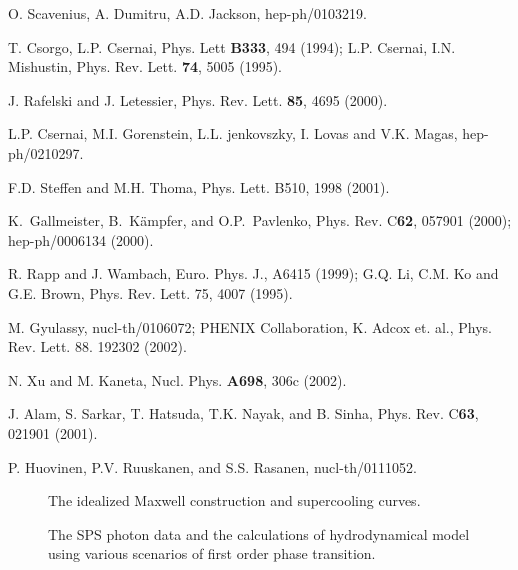 \begin{thebibliography}{00}
 O. Scavenius, A. Dumitru, A.D. Jackson, 
          hep-ph/0103219.
          
 T. Csorgo, L.P. Csernai, Phys. Lett {\bf B333}, 494 (1994);
       L.P. Csernai, I.N. Mishustin, Phys. Rev. Lett. {\bf 74}, 5005 (1995).
       
 J. Rafelski and J. Letessier, Phys. Rev. Lett. {\bf 85},
                  4695 (2000).

 L.P. Csernai, M.I. Gorenstein, L.L. jenkovszky, 
                        I. Lovas and V.K. Magas, hep-ph/0210297.

 F.D. Steffen and M.H. Thoma, Phys. Lett. B510, 
                  1998 (2001).
                  
 K.\ Gallmeister, B.\ K\"ampfer, and O.P.\ Pavlenko, 
            Phys. Rev. C{\bf 62}, 057901 (2000); hep-ph/0006134 (2000).

 R. Rapp and J. Wambach, Euro. Phys. J., A6415 (1999);
           G.Q. Li, C.M. Ko and G.E. Brown, Phys. Rev. Lett. 75,
           4007 (1995).

 M. Gyulassy, nucl-th/0106072; PHENIX Collaboration, 
           K. Adcox et. al., Phys. Rev. Lett. 88. 192302 (2002).

 N. Xu and M. Kaneta, Nucl. Phys. {\bf A698}, 306c (2002).

 J. Alam, S. Sarkar, T. Hatsuda, T.K. Nayak, and B. Sinha,
              Phys. Rev. C{\bf 63}, 021901 (2001).

 P. Huovinen, P.V. Ruuskanen, and S.S. Rasanen, nucl-th/0111052.
                
\end{thebibliography}


\begin{figure}[t]
\centerline{}
\caption{The idealized Maxwell construction and supercooling curves.}
\end{figure}

\begin{figure}[t]
\centerline{}
\caption{The SPS photon data and the calculations of hydrodynamical
model using various scenarios of first order phase transition.}
\end{figure}






